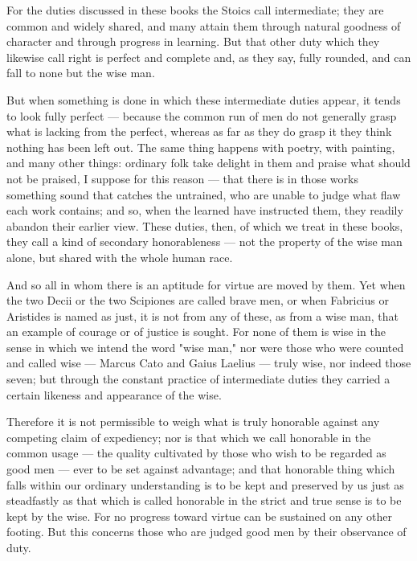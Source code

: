  For the duties discussed in these books the Stoics call intermediate; they are common and widely shared, and many attain them through natural goodness of character and through progress in learning. But that other duty which they likewise call right is perfect and complete and, as they say, fully rounded, and can fall to none but the wise man.

 But when something is done in which these intermediate duties appear, it tends to look fully perfect — because the common run of men do not generally grasp what is lacking from the perfect, whereas as far as they do grasp it they think nothing has been left out. The same thing happens with poetry, with painting, and many other things: ordinary folk take delight in them and praise what should not be praised, I suppose for this reason — that there is in those works something sound that catches the untrained, who are unable to judge what flaw each work contains; and so, when the learned have instructed them, they readily abandon their earlier view. These duties, then, of which we treat in these books, they call a kind of secondary honorableness — not the property of the wise man alone, but shared with the whole human race.

 And so all in whom there is an aptitude for virtue are moved by them. Yet when the two Decii or the two Scipiones are called brave men, or when Fabricius or Aristides is named as just, it is not from any of these, as from a wise man, that an example of courage or of justice is sought. For none of them is wise in the sense in which we intend the word "wise man," nor were those who were counted and called wise — Marcus Cato and Gaius Laelius — truly wise, nor indeed those seven; but through the constant practice of intermediate duties they carried a certain likeness and appearance of the wise.

 Therefore it is not permissible to weigh what is truly honorable against any competing claim of expediency; nor is that which we call honorable in the common usage — the quality cultivated by those who wish to be regarded as good men — ever to be set against advantage; and that honorable thing which falls within our ordinary understanding is to be kept and preserved by us just as steadfastly as that which is called honorable in the strict and true sense is to be kept by the wise. For no progress toward virtue can be sustained on any other footing. But this concerns those who are judged good men by their observance of duty.

